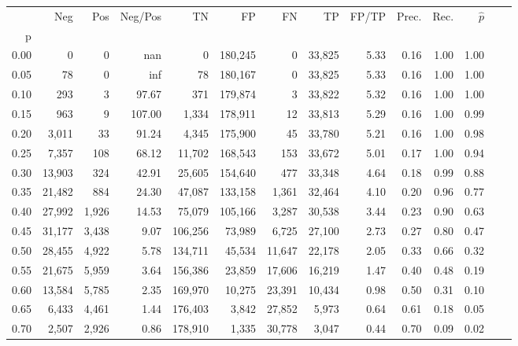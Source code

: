\begin{tabular}{rrrrrrrrrrrrrr}
\toprule
{} &     Neg &    Pos & Neg/Pos &       TN &       FP &      FN &      TP & FP/TP & Prec. &  Rec. & $\hat{p}$ \\
p    &         &        &         &          &          &         &         &       &       &       &           \\
\midrule
0.00 &       0 &      0 &     nan &        0 &  180,245 &       0 &  33,825 &  5.33 &  0.16 &  1.00 &      1.00 \\
0.05 &      78 &      0 &     inf &       78 &  180,167 &       0 &  33,825 &  5.33 &  0.16 &  1.00 &      1.00 \\
0.10 &     293 &      3 &   97.67 &      371 &  179,874 &       3 &  33,822 &  5.32 &  0.16 &  1.00 &      1.00 \\
0.15 &     963 &      9 &  107.00 &    1,334 &  178,911 &      12 &  33,813 &  5.29 &  0.16 &  1.00 &      0.99 \\
0.20 &   3,011 &     33 &   91.24 &    4,345 &  175,900 &      45 &  33,780 &  5.21 &  0.16 &  1.00 &      0.98 \\
0.25 &   7,357 &    108 &   68.12 &   11,702 &  168,543 &     153 &  33,672 &  5.01 &  0.17 &  1.00 &      0.94 \\
0.30 &  13,903 &    324 &   42.91 &   25,605 &  154,640 &     477 &  33,348 &  4.64 &  0.18 &  0.99 &      0.88 \\
0.35 &  21,482 &    884 &   24.30 &   47,087 &  133,158 &   1,361 &  32,464 &  4.10 &  0.20 &  0.96 &      0.77 \\
0.40 &  27,992 &  1,926 &   14.53 &   75,079 &  105,166 &   3,287 &  30,538 &  3.44 &  0.23 &  0.90 &      0.63 \\
0.45 &  31,177 &  3,438 &    9.07 &  106,256 &   73,989 &   6,725 &  27,100 &  2.73 &  0.27 &  0.80 &      0.47 \\
0.50 &  28,455 &  4,922 &    5.78 &  134,711 &   45,534 &  11,647 &  22,178 &  2.05 &  0.33 &  0.66 &      0.32 \\
0.55 &  21,675 &  5,959 &    3.64 &  156,386 &   23,859 &  17,606 &  16,219 &  1.47 &  0.40 &  0.48 &      0.19 \\
0.60 &  13,584 &  5,785 &    2.35 &  169,970 &   10,275 &  23,391 &  10,434 &  0.98 &  0.50 &  0.31 &      0.10 \\
0.65 &   6,433 &  4,461 &    1.44 &  176,403 &    3,842 &  27,852 &   5,973 &  0.64 &  0.61 &  0.18 &      0.05 \\
0.70 &   2,507 &  2,926 &    0.86 &  178,910 &    1,335 &  30,778 &   3,047 &  0.44 &  0.70 &  0.09 &      0.02 \\

\end{tabular}
